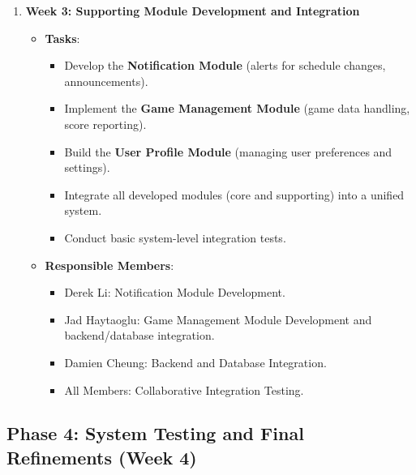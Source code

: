 \documentclass[12pt, titlepage]{article}
\begin{document}
\begin{enumerate}
  \item \textbf{Week 3: Supporting Module Development and Integration}
        \begin{itemize}
          \item \textbf{Tasks}:
                \begin{itemize}
                  \item Develop the \textbf{Notification Module} (alerts for schedule changes, announcements).
                  \item Implement the \textbf{Game Management Module} (game data handling, score reporting).
                  \item Build the \textbf{User Profile Module} (managing user preferences and settings).
                  \item Integrate all developed modules (core and supporting) into a unified system.
                  \item Conduct basic system-level integration tests.
                \end{itemize}
          \item \textbf{Responsible Members}:
                \begin{itemize}
                  \item Derek Li: Notification Module Development.
                  \item Jad Haytaoglu: Game Management Module Development and backend/database integration.
                  \item Damien Cheung: Backend and Database Integration.
                  \item All Members: Collaborative Integration Testing.
                \end{itemize}
        \end{itemize}
\end{enumerate}

\subsection*{Phase 4: System Testing and Final Refinements (Week 4)}
\end{document}
